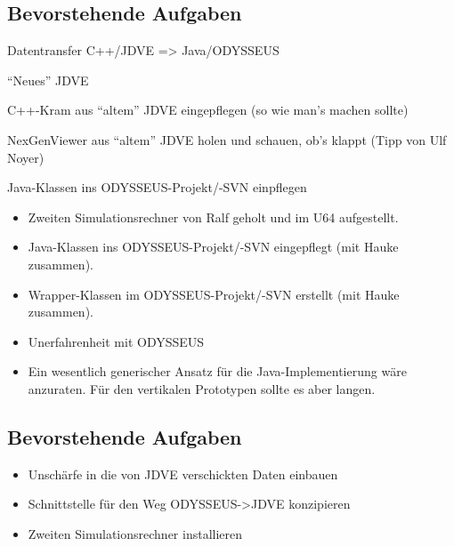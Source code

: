 \documentclass{scrartcl}  %
\renewenvironment{workToDo}{\subsection{Bevorstehende Aufgaben}}{}
\begin{document}
\begin{workToDo}
	\begin{itemize}
		\item Datentransfer C++/JDVE => Java/ODYSSEUS
			\item Java-Klassen ins ODYSSEUS-Projekt/-SVN einpflegen
		\end{compactitem}
	\end{itemize}
\end{workToDo}

\week

\begin{workDone}
	\begin{itemize}
		\item Zweiten Simulationsrechner von Ralf geholt und im U64 aufgestellt.
		\item Java-Klassen ins ODYSSEUS-Projekt/-SVN eingepflegt (mit Hauke zusammen).
		\item Wrapper-Klassen im ODYSSEUS-Projekt/-SVN erstellt (mit Hauke zusammen).
	\end{itemize}
\end{workDone}

\begin{workProblems}
	\begin{itemize}
		\item Unerfahrenheit mit ODYSSEUS
		\item Ein wesentlich generischer Ansatz für die Java-Implementierung wäre anzuraten. Für den vertikalen Prototypen sollte es aber langen.
	\end{itemize}
\end{workProblems}

\begin{workToDo}
	\begin{itemize}
		\item Unschärfe in die von JDVE verschickten Daten einbauen
		\item Schnittstelle für den Weg ODYSSEUS->JDVE konzipieren
		\item Zweiten Simulationsrechner installieren
	\end{itemize}
\end{workToDo}
\end{document}
